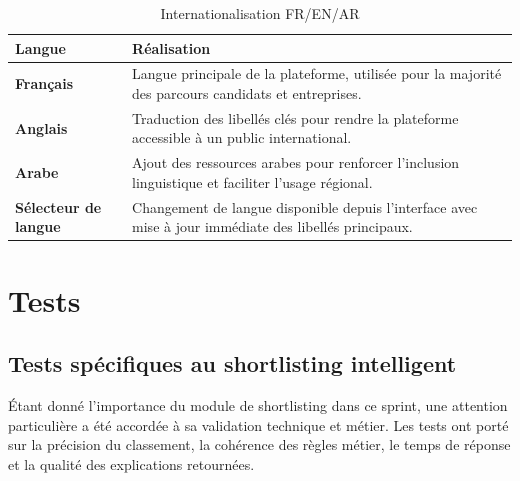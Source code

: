 \documentclass[12pt,a4paper]{report}
\newcommand{\tblhead}[1]{\cellcolor{darkblue}\color{white}\bfseries #1}
\newcommand{\tblleft}[1]{\bfseries\color{darkblue} #1}
\begin{document}
\renewcommand{\arraystretch}{1.25}
\begin{table}[H]
\centering
\begin{tabularx}{\textwidth}{|L{3.5cm}|Y|}
\hline
\tblhead{Langue} & \tblhead{Réalisation} \\
\hline
\tblleft{Français} & Langue principale de la plateforme, utilisée pour la majorité des parcours candidats et entreprises. \\
\hline
\tblleft{Anglais} & Traduction des libellés clés pour rendre la plateforme accessible à un public international. \\
\hline
\tblleft{Arabe} & Ajout des ressources arabes pour renforcer l'inclusion linguistique et faciliter l'usage régional. \\
\hline
\tblleft{Sélecteur de langue} & Changement de langue disponible depuis l'interface avec mise à jour immédiate des libellés principaux. \\
\hline
\end{tabularx}
\caption{Internationalisation FR/EN/AR}
\label{tab:i18n}
\end{table}
\renewcommand{\arraystretch}{1}

\section{Tests}

\subsection{Tests spécifiques au shortlisting intelligent}

Étant donné l'importance du module de shortlisting dans ce sprint, une attention particulière a été accordée à sa validation technique et métier. Les tests ont porté sur la précision du classement, la cohérence des règles métier, le temps de réponse et la qualité des explications retournées.
\end{document}
